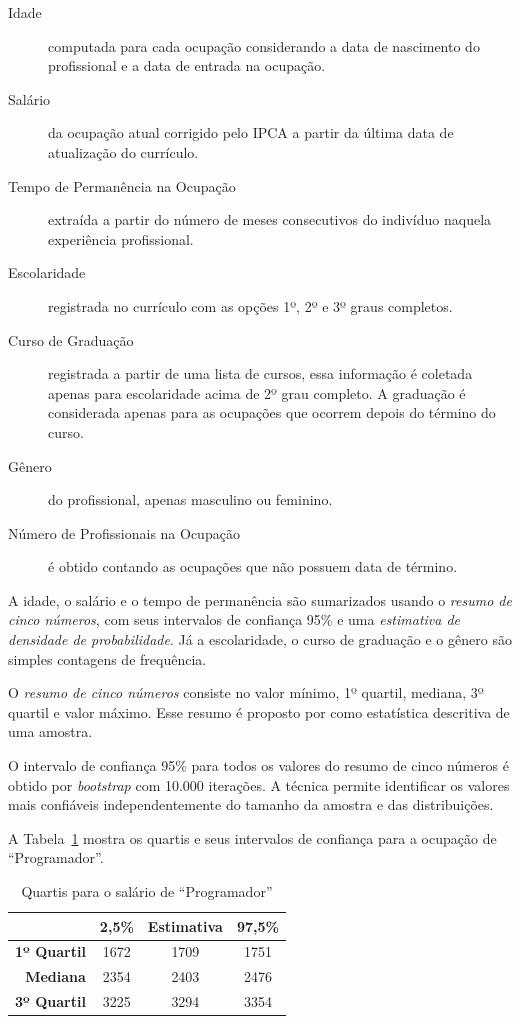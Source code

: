 \documentclass[12pt,a4paper]{article}
\begin{document}
\begin{description}
  \item[Idade] computada para cada ocupação considerando a data de nascimento do profissional e a data de entrada na ocupação.
  \item[Salário] da ocupação atual corrigido pelo IPCA a partir da última data de atualização do currículo.
  \item[Tempo de Permanência na Ocupação] extraída a partir do número de meses consecutivos do indivíduo naquela experiência profissional.
  \item[Escolaridade] registrada no currículo com as opções 1º, 2º e 3º graus completos.
  \item[Curso de Graduação] registrada a partir de uma lista de cursos, essa informação é coletada apenas para escolaridade acima de 2º grau completo. A graduação é considerada apenas para as ocupações que ocorrem depois do término do curso.
  \item[Gênero] do profissional, apenas masculino ou feminino.
  \item[Número de Profissionais na Ocupação] é obtido contando as ocupações que não possuem data de término.
\end{description}

A idade, o salário e o tempo de permanência são sumarizados usando o \textit{resumo de cinco números}, com seus intervalos de confiança 95\% e uma \textit{estimativa de densidade de probabilidade}. Já a escolaridade, o curso de graduação e o gênero são simples contagens de frequência.

O \textit{resumo de cinco números} consiste no valor mínimo, 1º quartil, mediana, 3º quartil e valor máximo. Esse resumo é proposto por  como estatística descritiva de uma amostra.

O intervalo de confiança 95\% para todos os valores do resumo de cinco números é obtido por \textit{bootstrap} com 10.000 iterações. A técnica permite identificar os valores mais confiáveis independentemente do tamanho da amostra e das distribuições.

A Tabela~\ref{tab:resumo-salario-programador} mostra os quartis e seus intervalos de confiança para a ocupação de \enquote{Programador}.

\begin{table}[htb]
    \centering
    \begin{tabular}{r|c|c|c}
        & \textbf{2,5\%} & \textbf{Estimativa} & \textbf{97,5\%} \\ \hline
        \textbf{1º Quartil} & 1672           & 1709                & 1751 \\ \hline
        \textbf{Mediana}    & 2354           & 2403                & 2476 \\ \hline
        \textbf{3º Quartil} & 3225           & 3294                & 3354 \\
    \end{tabular}
    \caption{Quartis para o salário de \enquote{Programador}}
    \label{tab:resumo-salario-programador}
\end{table}
\end{document}
